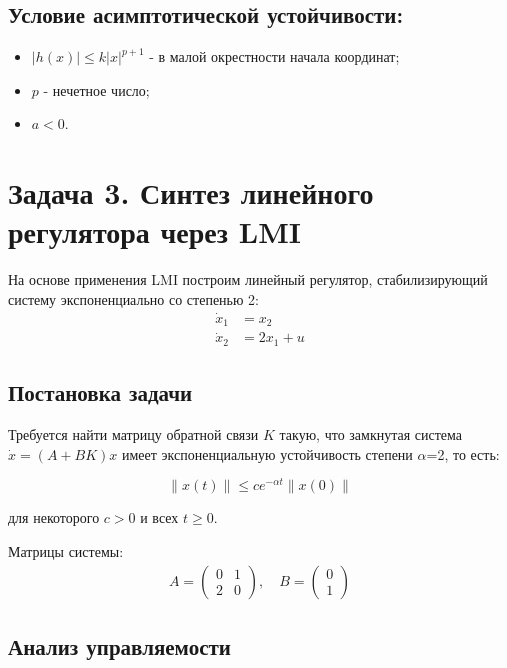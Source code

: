 \subsection{Условие асимптотической устойчивости:}
\begin{itemize}
\item $|h(x)| \leq k|x|^{p+1}$ - в малой окрестности начала координат;
\item $p$ - нечетное число;
\item $a < 0$.
\end{itemize}

\section*{Задача 3. Синтез линейного регулятора через LMI}

На основе применения LMI построим линейный регулятор, стабилизирующий систему экспоненциально со степенью 2:
\begin{align*}
\dot{x}_1 &= x_2 \\
\dot{x}_2 &= 2x_1 + u
\end{align*}

\subsection*{Постановка задачи}

Требуется найти матрицу обратной связи $K$ такую, что замкнутая система $\dot{x} = (A + BK)x$ имеет экспоненциальную устойчивость степени $\alpha$=2, то есть:

\begin{equation}
\|x(t)\| \leq ce^{-\alpha t}\|x(0)\|
\end{equation}

для некоторого $c > 0$ и всех $t \geq 0$.

Матрицы системы:
\begin{align*}
A = \begin{pmatrix} 0 & 1 \\ 2 & 0 \end{pmatrix}, \quad
B = \begin{pmatrix} 0 \\ 1 \end{pmatrix}
\end{align*}

\subsection*{Анализ управляемости}

